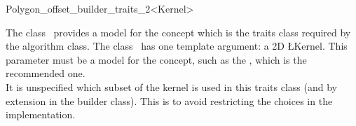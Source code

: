 

\begin{ccRefClass}{Polygon_offset_builder_traits_2<Kernel>}


\ccDefinition

The class \ccRefName\ provides a model for the
 concept which is the traits class
required by the  algorithm class. The class 
\ccRefName\ has one template argument: a 2D \cgal\L Kernel. This parameter must be a model for the  concept, such as the , which is the recommended one.\\
It is unspecified which subset of the kernel is used in this traits class (and by extension in the builder class). This is to avoid restricting the choices in the implementation.


\ccIsModel
{}\\
\\
\\

\ccSeeAlso
{}

\end{ccRefClass}


